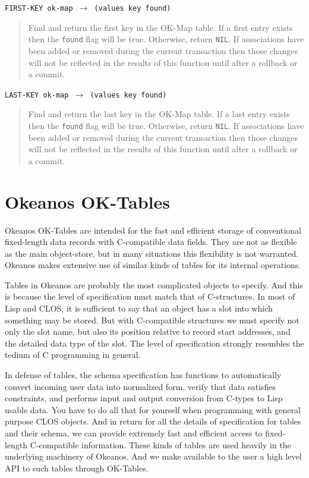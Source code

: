 \documentclass[article,oneside]{memoir}
\begin{document}
 
\noindent \texttt{FIRST-KEY ok-map $\rightarrow$ (values key found)}

\begin{quote}
Find and return the first key in the OK-Map table. If a first entry exists then the \texttt{found} flag will be true. Otherwise, return \texttt{NIL}. If associations have been added or removed during the current transaction then those changes will not be reflected in the results of this function until after a rollback or a commit.
\end{quote}

\noindent \texttt{LAST-KEY ok-map $\rightarrow$ (values key found)}

\begin{quote}
Find and return the last key in the OK-Map table. If a last entry exists then the \texttt{found} flag will be true. Otherwise, return \texttt{NIL}. If associations have been added or removed during the current transaction then those changes will not be reflected in the results of this function until after a rollback or a commit.
\end{quote}



\chapter{Okeanos OK-Tables}
Okeanos OK-Tables are intended for the fast and efficient storage of conventional fixed-length data records with C-compatible data fields. They are not as flexible as the main object-store, but in many situations this flexibility is not warranted. Okeanos makes extensive use of similar kinds of tables for its internal operations.

Tables in Okeanos are probably the most complicated objects to specify. And this is because the level of specification must match that of C-structures. In most of Lisp and CLOS, it is sufficient to say that an object has a slot into which something may be stored. But with C-compatible structures we must specify not only the slot name, but also its position relative to record start addresses, and the detailed data type of the slot. The level of specification strongly resembles the tedium of C programming in general.

In defense of tables, the schema specification has functions to automatically convert incoming user data into normalized form, verify that data satisfies constraints, and performs input and output conversion from C-types to Lisp usable data. You have to do all that for yourself when programming with general purpose CLOS objects. And in return for all the details of specification for tables and their schema, we can provide extremely fast and efficient access to fixed-length C-compatible information. These kinds of tables are used heavily in the underlying machinery of Okeanos. And we make available to the user a high level API to such tables through OK-Tables.
\end{document}
